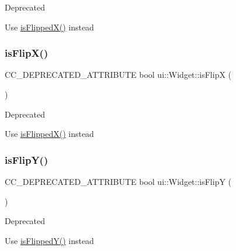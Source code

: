 \begin{DoxyRefDesc}{Deprecated}
\item[\hyperlink{deprecated__deprecated000172}{Deprecated}]Use \hyperlink{classui_1_1Widget_aa21dc6a63ebb20bc0dc78293d0f03256}{is\+Flipped\+X()} instead \end{DoxyRefDesc}
\mbox{\label{classui_1_1Widget_a21bb179e181b815212a32d4ab5b53f93}} 
\subsubsection{\texorpdfstring{is\+Flip\+X()}{isFlipX()}\hspace{0.1cm}{\footnotesize\ttfamily [2/2]}}
{\footnotesize\ttfamily C\+C\+\_\+\+D\+E\+P\+R\+E\+C\+A\+T\+E\+D\+\_\+\+A\+T\+T\+R\+I\+B\+U\+TE bool ui\+::\+Widget\+::is\+FlipX (\begin{DoxyParamCaption}{ }\end{DoxyParamCaption})\hspace{0.3cm}{\ttfamily [inline]}}

\begin{DoxyRefDesc}{Deprecated}
\item[\hyperlink{deprecated__deprecated000407}{Deprecated}]Use \hyperlink{classui_1_1Widget_aa21dc6a63ebb20bc0dc78293d0f03256}{is\+Flipped\+X()} instead \end{DoxyRefDesc}
\mbox{\label{classui_1_1Widget_aff62decd50746935b04665e656678d7b}} 
\subsubsection{\texorpdfstring{is\+Flip\+Y()}{isFlipY()}\hspace{0.1cm}{\footnotesize\ttfamily [1/2]}}
{\footnotesize\ttfamily C\+C\+\_\+\+D\+E\+P\+R\+E\+C\+A\+T\+E\+D\+\_\+\+A\+T\+T\+R\+I\+B\+U\+TE bool ui\+::\+Widget\+::is\+FlipY (\begin{DoxyParamCaption}{ }\end{DoxyParamCaption})\hspace{0.3cm}{\ttfamily [inline]}}

\begin{DoxyRefDesc}{Deprecated}
\item[\hyperlink{deprecated__deprecated000174}{Deprecated}]Use \hyperlink{classui_1_1Widget_a25f551f2348e0f7b953d682045b10325}{is\+Flipped\+Y()} instead \end{DoxyRefDesc}
\mbox{\label{classui_1_1Widget_aff62decd50746935b04665e656678d7b}} 
